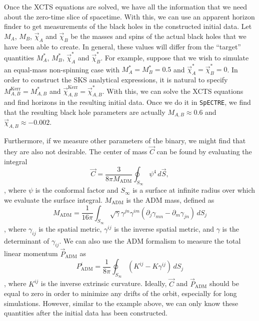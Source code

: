 \documentclass{../document}
\begin{document}
  Once the XCTS equations are solved, we have all the information that we need about the zero-time slice of spacetime. With this, we can use an apparent horizon finder to get measurements of the black holes in the constructed initial data. Let $M_A$, $M_B$, $\vec\chi_{A}$ and $\vec\chi_{B}$ be the masses and spins of the actual black holes that we have been able to create. In general, these values will differ from the ``target'' quantities $M^*_A$, $M^*_B$, $\vec\chi^*_{A}$ and $\vec\chi^*_{B}$. For example, suppose that we wish to simulate an equal-mass non-spinning case with $M^*_A = M^*_B = 0.5$ and $\vec\chi^*_{A} = \vec\chi^*_{B} = 0$. In order to construct the SKS analytical expressions, it is natural to specify $M^\text{Kerr}_{A,B} = M^*_{A,B}$ and $\vec\chi^\text{Kerr}_{A,B} = \vec\chi^*_{A,B}$. With this, we can solve the XCTS equations and find horizons in the resulting initial data. Once we do it in {\tt SpECTRE}, we find that the resulting black hole parameters are actually $M_{A,B} \approx 0.6$ and $\vec\chi_{A,B} \approx - 0.002$.

  Furthermore, if we measure other parameters of the binary, we might find that they are also not desirable. The center of mass $\vec C$ can be found by evaluating the integral
  \begin{equation}
    \vec C = \frac{3}{8 \pi M_\text{ADM}} \oint_{S_\infty} \psi^4 \, d\vec S,
  \end{equation}
  \cite{Serguei}, where $\psi$ is the conformal factor and $S_\infty$ is a surface at infinite radius over which we evaluate the surface integral. $M_\text{ADM}$ is the ADM mass, defined as
  \begin{equation}
    M_\text{ADM} = \frac{1}{16 \pi} \int_{S_\infty} \sqrt{\gamma} \gamma^{jn} \gamma^{im} (\partial_j \gamma_{mn} - \partial_m \gamma_{jn}) \, dS_j
  \end{equation}
  \cite{BaumgarteShapiro}, where $\gamma_{ij}$ is the spatial metric, $\gamma^{ij}$ is the inverse spatial metric, and $\gamma$ is the determinant of $\gamma_{ij}$. We can also use the ADM formalism to measure the total linear momentum $\vec P_\text{ADM}$ as
  \begin{equation}
    P_\text{ADM}^i = \frac{1}{8\pi} \oint_{S_\infty} (K^{ij} - K \gamma^{ij}) \, dS_j
  \end{equation}
  \cite{Serguei}, where $K^{ij}$ is the inverse extrinsic curvature. Ideally, $\vec C$ and $\vec P_\text{ADM}$ should be equal to zero in order to minimize any drifts of the orbit, especially for long simulations. However, similar to the example above, we can only know these quantities after the initial data has been constructed.
  
\end{document}
